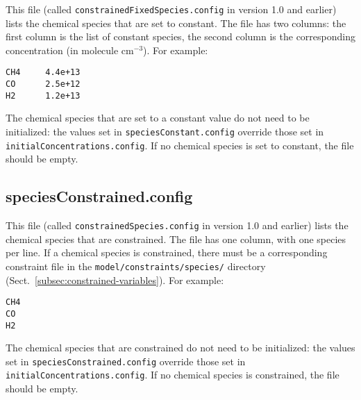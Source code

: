 This file (called \texttt{constrainedFixedSpecies.config} in version
1.0 and earlier) lists the chemical species that are set to
constant. The file has two columns: the first column is the list of
constant species, the second column is the corresponding concentration
(in molecule cm$^{-3}$). For example:

\begin{verbatim}
CH4     4.4e+13
CO      2.5e+12
H2      1.2e+13
\end{verbatim}

The chemical species that are set to a constant value do not need to
be initialized: the values set in \texttt{speciesConstant.config}
override those set in \texttt{initialConcentrations.config}. If no
chemical species is set to constant, the file should be empty.

\subsection{speciesConstrained.config} \label{subsec:speciesconstrained}

This file (called \texttt{constrainedSpecies.config} in version 1.0
and earlier) lists the chemical species that are constrained. The file
has one column, with one species per line. If a chemical species is
constrained, there must be a corresponding constraint file in the
\texttt{model/constraints/species/} directory
(Sect.~\ref{subsec:constrained-variables}). For example:

\begin{verbatim}
CH4
CO
H2
\end{verbatim}

The chemical species that are constrained do not need to be
initialized: the values set in \texttt{speciesConstrained.config}
override those set in \texttt{initialConcentrations.config}. If no
chemical species is constrained, the file should be empty.
